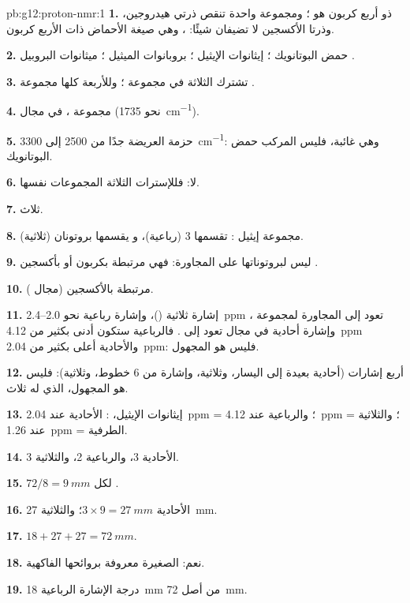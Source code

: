 \begin{solution}{pb:g12:proton-nmr:1}
\textbf{1.}  ذو أربع  كربون هو ؛ ومجموعة  واحدة
تنقص ذرتي هيدروجين، وذرتا الأكسجين لا تضيفان شيئًا: ، وهي
صيغة الأحماض  ذات الأربع  كربون.

\textbf{2.} حمض البوتانويك ؛ إيثانوات الإيثيل
؛ بروبانوات الميثيل ؛ ميثانوات
البروبيل .

\textbf{3.} تشترك  الثلاثة في مجموعة ؛ وللأربعة كلها
مجموعة .

\textbf{4.} مجموعة ، في مجال  (نحو \qty{1735}{cm^{-1}}).

\textbf{5.} حزمة  العريضة جدًا من 2500 إلى
\qty{3300}{cm^{-1}}: وهي غائبة، فليس المركب حمض البوتانويك.

\textbf{6.} لا: فللإسترات الثلاثة المجموعات نفسها.

\textbf{7.} ثلاث.

\textbf{8.} مجموعة إيثيل :  تقسمها 3
 (رباعية)، و يقسمها بروتونان (ثلاثية).

\textbf{9.} ليس لبروتوناتها  على  المجاورة: فهي
 مرتبطة بكربون  أو بأكسجين .

\textbf{10.}  مرتبطة بالأكسجين (مجال ).

\textbf{11.} إشارة ثلاثية ()، وإشارة رباعية نحو 2.0--\qty{2.4}{ppm} تعود إلى
 المجاورة لمجموعة ، وإشارة أحادية في مجال  تعود إلى
. فالرباعية ستكون أدنى بكثير من \qty{4.12}{ppm} والأحادية
أعلى بكثير من \qty{2.04}{ppm}: فليس هو المجهول.

\textbf{12.} أربع إشارات (أحادية بعيدة إلى اليسار، وثلاثية، وإشارة من 6
خطوط، وثلاثية): فليس هو المجهول، الذي له ثلاث.

\textbf{13.} إيثانوات الإيثيل، : الأحادية عند
\qty{2.04}{ppm} = ؛ والرباعية عند \qty{4.12}{ppm} = ؛
والثلاثية عند \qty{1.26}{ppm} =  الطرفية.

\textbf{14.} الأحادية 3، والرباعية 2، والثلاثية 3.

\textbf{15.} $72 / 8 = \qty{9}{mm}$ لكل .

\textbf{16.} الأحادية $3 \times 9 = \qty{27}{mm}$؛ والثلاثية
\qty{27}{mm}.

\textbf{17.} $18 + 27 + 27 = \qty{72}{mm}$.

\textbf{18.} نعم:  الصغيرة معروفة بروائحها الفاكهية.

\textbf{19.} درجة الإشارة الرباعية \qty{18}{mm} من أصل \qty{72}{mm}.
\end{solution}
